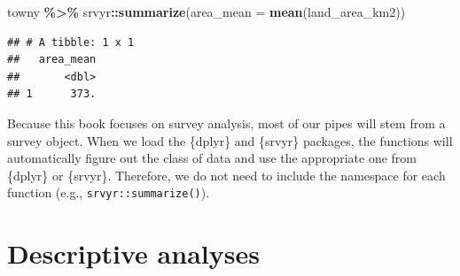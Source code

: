\documentclass[
]{krantz}
\makeatletter
\newenvironment{Shaded}{\begin{snugshade}}{\end{snugshade}}
\newcommand{\AttributeTok}[1]{\textcolor[rgb]{0.27,0.27,0.27}{#1}}
\newcommand{\FunctionTok}[1]{\textcolor[rgb]{0.27,0.27,0.27}{\textbf{#1}}}
\newcommand{\NormalTok}[1]{#1}
\newcommand{\SpecialCharTok}[1]{\textcolor[rgb]{0.43,0.43,0.43}{\textbf{#1}}}
\newenvironment{kframe}{%
\medskip{}
\setlength{\fboxsep}{.8em}
 \def\at@end@of@kframe{}%
 \ifinner\ifhmode%
  \def\at@end@of@kframe{\end{minipage}}%
  \begin{minipage}{\columnwidth}%
 \fi\fi%
 \def\FrameCommand##1{\hskip\@totalleftmargin \hskip-\fboxsep
 \colorbox{shadecolor}{##1}\hskip-\fboxsep
     \hskip-\linewidth \hskip-\@totalleftmargin \hskip\columnwidth}%
 \MakeFramed {\advance\hsize-\width
   \@totalleftmargin\z@ \linewidth\hsize
   \@setminipage}}%
 {\par\unskip\endMakeFramed%
 \at@end@of@kframe}
\renewenvironment{Shaded}{\begin{kframe}}{\end{kframe}}
\makeatother
\begin{document}
\begin{Shaded}
\begin{Highlighting}[]
\NormalTok{towny }\SpecialCharTok{\%\textgreater{}\%}
\NormalTok{  srvyr}\SpecialCharTok{::}\FunctionTok{summarize}\NormalTok{(}\AttributeTok{area\_mean =} \FunctionTok{mean}\NormalTok{(land\_area\_km2))}
\end{Highlighting}
\end{Shaded}

\begin{verbatim}
## # A tibble: 1 x 1
##   area_mean
##       <dbl>
## 1      373.
\end{verbatim}

Because this book focuses on survey analysis, most of our pipes will stem from a survey object. When we load the \{dplyr\} and \{srvyr\} packages, the functions will automatically figure out the class of data and use the appropriate one from \{dplyr\} or \{srvyr\}. Therefore, we do not need to include the namespace for each function (e.g., \texttt{srvyr::summarize()}).

\hypertarget{c05-descriptive-analysis}{%
\chapter{Descriptive analyses}\label{c05-descriptive-analysis}}
\end{document}
